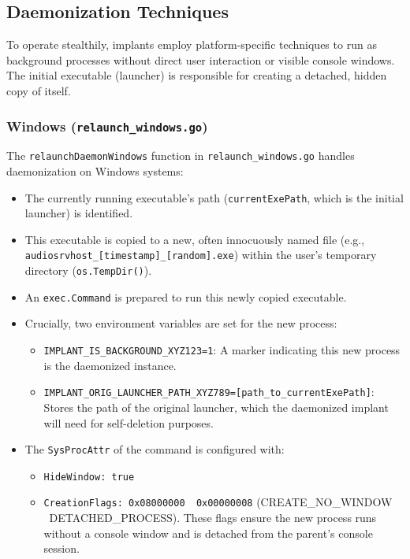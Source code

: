 \subsection{Daemonization Techniques}
To operate stealthily, implants employ platform-specific techniques to run as background processes without direct user interaction or visible console windows. The initial executable (launcher) is responsible for creating a detached, hidden copy of itself.

\subsubsection{Windows (\texttt{relaunch\_windows.go})}
The \texttt{relaunchDaemonWindows} function in \texttt{relaunch\_windows.go} handles daemonization on Windows systems:
\begin{itemize}
    \item The currently running executable's path (\texttt{currentExePath}, which is the initial launcher) is identified.
    \item This executable is copied to a new, often innocuously named file (e.g., \texttt{audiosrvhost\_[timestamp]\_[random].exe}) within the user's temporary directory (\texttt{os.TempDir()}).
    \item An \texttt{exec.Command} is prepared to run this newly copied executable.
    \item Crucially, two environment variables are set for the new process:
        \begin{itemize}
            \item \texttt{IMPLANT\_IS\_BACKGROUND\_XYZ123=1}: A marker indicating this new process is the daemonized instance.
            \item \texttt{IMPLANT\_ORIG\_LAUNCHER\_PATH\_XYZ789=[path\_to\_currentExePath]}: Stores the path of the original launcher, which the daemonized implant will need for self-deletion purposes.
        \end{itemize}
    \item The \texttt{SysProcAttr} of the command is configured with:
        \begin{itemize}
            \item \texttt{HideWindow: true}
            \item \texttt{CreationFlags: 0x08000000 \textbar \ 0x00000008} (CREATE\_NO\_WINDOW \textbar \ DETACHED\_PROCESS). These flags ensure the new process runs without a console window and is detached from the parent's console session.
        \end{itemize}

\end{itemize}
